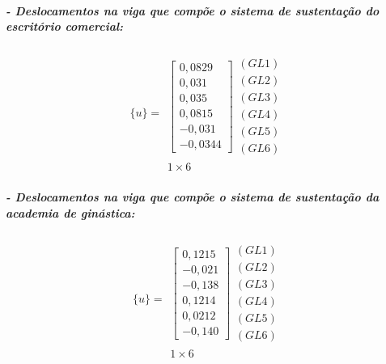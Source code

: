\documentclass[12pt,a4paper]{article}
\begin{document}
\subparagraph{- Deslocamentos na viga que compõe o sistema de sustentação do escritório comercial:}

$$\{u\} = \begin{array}{c}
\left[ \begin{array}{c}0,0829 \\ 0,031 \\ 0,035 \\ 0,0815 \\ -0,031 \\ -0,0344\end{array}  \right] \begin{array}{c} (GL 1) \\ (GL 2) \\ (GL 3) \\ (GL 4) \\ (GL 5) \\ (GL 6) \end{array} \\ 1 \times 6
\end{array}$$

\subparagraph{- Deslocamentos na viga que compõe o sistema de sustentação da academia de ginástica:}

$$\{u\} = \begin{array}{c}
\left[ \begin{array}{c}0,1215 \\ -0,021 \\ -0,138 \\ 0,1214 \\ 0,0212 \\ -0,140\end{array}  \right] \begin{array}{c} (GL 1) \\ (GL 2) \\ (GL 3) \\ (GL 4) \\ (GL 5) \\ (GL 6) \end{array} \\ 1 \times 6
\end{array}$$
\end{document}
